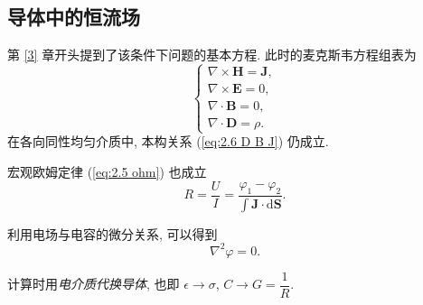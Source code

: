 \subsection{导体中的恒流场}
第 \ref{3} 章开头提到了该条件下问题的基本方程. 此时的麦克斯韦方程组表为
\begin{equation}
    \begin{cases}
        \nabla\times\bm{H}=\bm{J}, \\
        \nabla\times\bm{E}=0,      \\
        \nabla\cdot\bm{B}=0,       \\
        \nabla\cdot\bm{D}=\rho.
    \end{cases}
\end{equation}
在各向同性均匀介质中, 本构关系 (\ref{eq:2.6 D B J}) 仍成立.

宏观欧姆定律 (\ref{eq:2.5 ohm}) 也成立
\begin{equation}
    R=\frac{U}{I}=\frac{\varphi_1-\varphi_2}{\displaystyle\int\bm{J}\cdot\mathrm{d}\bm{S}}.
\end{equation}

利用电场与电容的微分关系, 可以得到
\begin{equation}
    \nabla^2\varphi=0.
\end{equation}

计算时用\textit{电介质代换导体}, 也即 $\epsilon\rightarrow\sigma$, $C\rightarrow G=\dfrac{1}{R}$.
